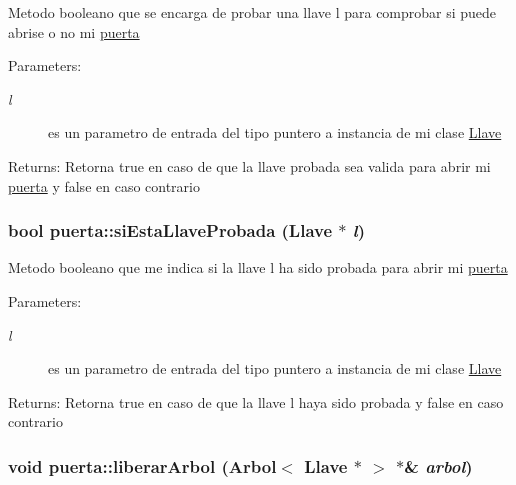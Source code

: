 Metodo booleano que se encarga de probar una llave l para comprobar si puede abrise o no mi \hyperlink{classpuerta}{puerta} \begin{Desc}
\item[Parameters:]
\begin{description}
\item[{\em l}]es un parametro de entrada del tipo puntero a instancia de mi clase \hyperlink{classLlave}{Llave} \end{description}
\end{Desc}
\begin{Desc}
\item[Returns:]Retorna true en caso de que la llave probada sea valida para abrir mi \hyperlink{classpuerta}{puerta} y false en caso contrario \end{Desc}
\hypertarget{classpuerta_9f108f67092846743458195fca60d6ca}{
\subsubsection[siEstaLlaveProbada]{\setlength{\rightskip}{0pt plus 5cm}bool puerta::siEstaLlaveProbada ({\bf Llave} $\ast$ {\em l})}}
\label{classpuerta_9f108f67092846743458195fca60d6ca}


Metodo booleano que me indica si la llave l ha sido probada para abrir mi \hyperlink{classpuerta}{puerta} \begin{Desc}
\item[Parameters:]
\begin{description}
\item[{\em l}]es un parametro de entrada del tipo puntero a instancia de mi clase \hyperlink{classLlave}{Llave} \end{description}
\end{Desc}
\begin{Desc}
\item[Returns:]Retorna true en caso de que la llave l haya sido probada y false en caso contrario \end{Desc}
\hypertarget{classpuerta_d4d085f48f3b014afbba4113510b63d8}{
\subsubsection[liberarArbol]{\setlength{\rightskip}{0pt plus 5cm}void puerta::liberarArbol ({\bf Arbol}$<$ {\bf Llave} $\ast$ $>$ $\ast$\& {\em arbol})}}
\label{classpuerta_d4d085f48f3b014afbba4113510b63d8}


